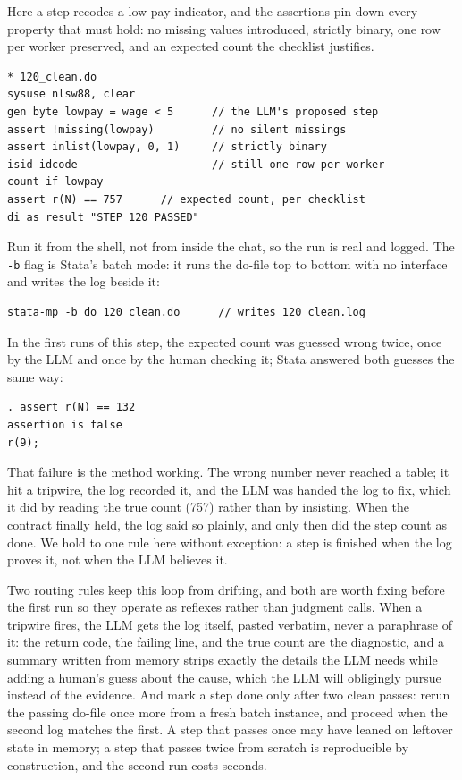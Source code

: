 \documentclass[
    a4paper,
    fontsize=10pt,
    twoside=true,
    numbers=noenddot,
]{kaobook}
\begin{document}
Here a step recodes a low-pay indicator, and the assertions pin down every property that must hold: no missing values introduced, strictly binary, one row per worker preserved, and an expected count the checklist justifies.
\par
{\footnotesize
\begin{verbatim}
* 120_clean.do
sysuse nlsw88, clear
gen byte lowpay = wage < 5      // the LLM's proposed step
assert !missing(lowpay)         // no silent missings
assert inlist(lowpay, 0, 1)     // strictly binary
isid idcode                     // still one row per worker
count if lowpay
assert r(N) == 757      // expected count, per checklist
di as result "STEP 120 PASSED"
\end{verbatim}
}
Run it from the shell, not from inside the chat, so the run is real and logged. The \texttt{-b} flag is Stata's batch mode: it runs the do-file top to bottom with no interface and writes the log beside it:
\par
{\footnotesize
\begin{verbatim}
stata-mp -b do 120_clean.do      // writes 120_clean.log
\end{verbatim}
}
In the first runs of this step, the expected count was guessed wrong twice, once by the LLM and once by the human checking it; Stata answered both guesses the same way:
\par
{\footnotesize
\begin{verbatim}
. assert r(N) == 132
assertion is false
r(9);
\end{verbatim}
}
That failure is the method working. The wrong number never reached a table; it hit a tripwire, the log recorded it, and the LLM was handed the log to fix, which it did by reading the true count (757) rather than by insisting. When the contract finally held, the log said so plainly, and only then did the step count as done. We hold to one rule here without exception: a step is finished when the log proves it, not when the LLM believes it.

Two routing rules keep this loop from drifting, and both are worth fixing before the first run so they operate as reflexes rather than judgment calls. When a tripwire fires, the LLM gets the log itself, pasted verbatim, never a paraphrase of it: the return code, the failing line, and the true count are the diagnostic, and a summary written from memory strips exactly the details the LLM needs while adding a human's guess about the cause, which the LLM will obligingly pursue instead of the evidence. And mark a step done only after two clean passes: rerun the passing do-file once more from a fresh batch instance, and proceed when the second log matches the first. A step that passes once may have leaned on leftover state in memory; a step that passes twice from scratch is reproducible by construction, and the second run costs seconds.
\end{document}
